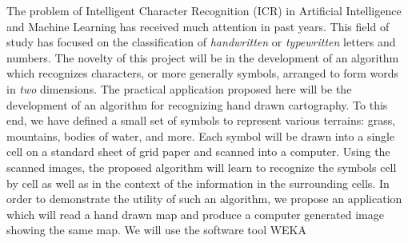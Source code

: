 
The problem of Intelligent Character Recognition (ICR) in Artificial
Intelligence and Machine Learning has received much attention in past years.
This field of study has focused on the classification of \emph{handwritten}  or
\emph{typewritten} letters and numbers.  The novelty of this project will be in
the development of an algorithm which recognizes characters, or more generally
symbols, arranged to form words in \emph{two} dimensions. The practical
application proposed here will be the development of an algorithm for
recognizing hand drawn cartography. To this end, we have defined a small set of
symbols to represent various terrains: grass, mountains, bodies of water, and
more. Each symbol will be drawn into a single cell on a standard sheet of grid
paper and scanned into a computer. Using the scanned images, the proposed
algorithm will learn to recognize the symbols cell by cell as well as in the
context of the information in the surrounding cells. In order to demonstrate
the utility of such an algorithm, we propose an application which will read a
hand drawn map and produce a computer generated image showing the same map. We
will use the software tool WEKA\cite{hall2009}

